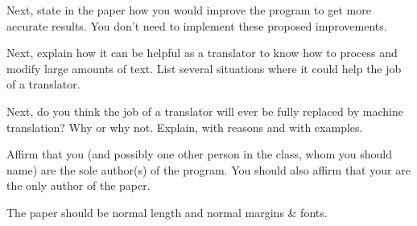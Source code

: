 \documentclass[11pt]{article}
\begin{document}
\begin{spacing}{1.35}
Next, state in the paper how you would improve the program to get more accurate results.
You don't need to implement these proposed improvements.

Next, explain how it can be helpful as a translator to know how to process and modify large amounts of text.
List several situations where it could help the job of a translator.

Next, do you think the job of a translator will ever be fully replaced by machine translation?
Why or why not.
Explain, with reasons and with examples.

Affirm that you (and possibly one other person in the class, whom you should name) are the sole author(s) of the program.
You should also affirm that your are the only author of the paper.

The paper should be normal length and normal margins \& fonts.
\end{spacing}
%
\end{document}
